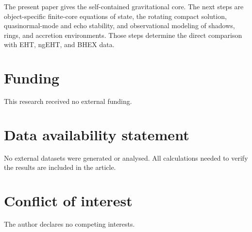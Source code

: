 \documentclass[12pt,a4paper]{article}
\begin{document}
The present paper gives the self-contained gravitational core. The next steps are object-specific finite-core equations of state, the rotating compact solution, quasinormal-mode and echo stability, and observational modeling of shadows, rings, and accretion environments. Those steps determine the direct comparison with EHT, ngEHT, and BHEX data.

\section*{Funding}

This research received no external funding.

\section*{Data availability statement}

No external datasets were generated or analysed. All calculations needed to
verify the results are included in the article.

\section*{Conflict of interest}

The author declares no competing interests.
\end{document}

